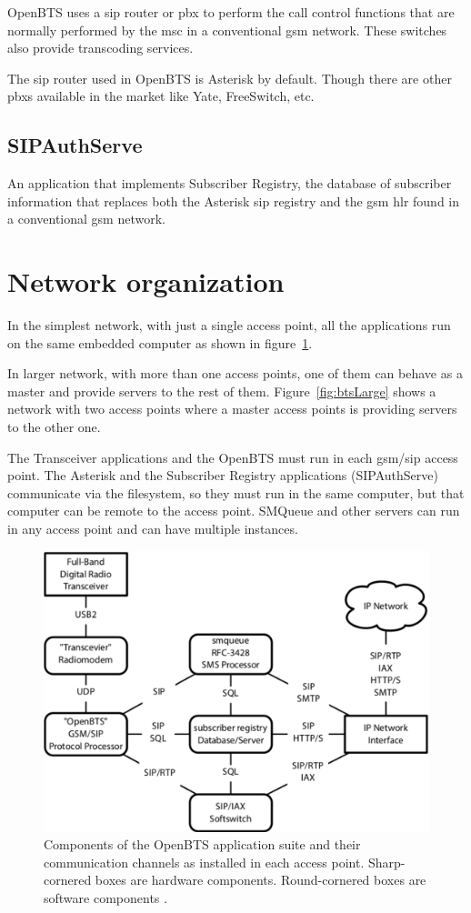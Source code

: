 OpenBTS uses a \gls{sip} router or \gls{pbx} to perform the 
call control functions that are normally performed by the \gls{msc}
in a conventional \gls{gsm} network. These switches also provide transcoding 
services.

The \gls{sip} router used in OpenBTS is Asterisk by default. Though there are other
\glspl{pbx} available in the market like Yate, FreeSwitch, etc.

\subsection{SIPAuthServe}
An application that implements Subscriber Registry, the database of subscriber 
information that replaces both the Asterisk \gls{sip} registry and the
\gls{gsm} \gls{hlr} found in a conventional \gls{gsm} network.

\section{Network organization}
In the simplest network, with just a single access point, all the applications run
on the same embedded computer as shown in figure~\ref{fig:btsSimple}.

In larger network, with more than one access points, one of them can behave as a master and provide servers to the rest of them.
Figure~\ref{fig:btsLarge} shows a network with two access points where
a master access points is providing servers to the other one.

The Transceiver applications and the OpenBTS must run in each \gls{gsm}/\gls{sip} access point. 
The Asterisk and the Subscriber Registry applications (SIPAuthServe) 
communicate via the filesystem, so they must run in the same computer,
but that computer can be remote to the access point. 
SMQueue and other servers can run in any access point and can have 
multiple instances.
\begin{figure}
  \centering
    \includegraphics[width=\textwidth]{../images/btsSimple}
  \caption[Simplest OpenBTS network]{Components of the OpenBTS application suite 
  and their communication channels as installed in each
access point. Sharp-cornered boxes are hardware components.
Round-cornered boxes are software components \protect\cite{openbtsMan}.}
  \label{fig:btsSimple}
\end{figure}

